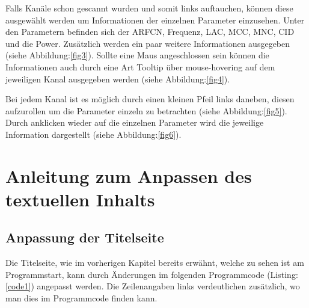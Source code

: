 \noindent Falls Kanäle schon gescannt wurden und somit links auftauchen, können diese ausgewählt werden um Informationen der einzelnen Parameter einzusehen.
Unter den Parametern befinden sich der ARFCN, Frequenz, LAC, MCC, MNC, CID und die Power.
Zusätzlich werden ein paar weitere Informationen ausgegeben (siehe Abbildung:\ref{fig3}).
Sollte eine Maus angeschlossen sein können die Informationen auch durch eine Art Tooltip über mouse-hovering auf dem jeweiligen Kanal ausgegeben werden (siehe Abbildung:\ref{fig4}).




\newpage Bei jedem Kanal ist es möglich durch einen kleinen Pfeil links daneben, diesen aufzurollen um die Parameter einzeln zu betrachten (siehe Abbildung:\ref{fig5}). Durch anklicken wieder auf die einzelnen Parameter wird die jeweilige Information dargestellt (siehe Abbildung:\ref{fig6}).




\newpage
\section{Anleitung zum Anpassen des textuellen Inhalts}

%
%

\subsection*{Anpassung der Titelseite}

%
%
Die Titelseite, wie im vorherigen Kapitel bereits erwähnt, welche zu sehen ist am Programmstart, kann durch Änderungen im folgenden Programmcode (Listing: \ref{code1}) angepasst werden.
Die Zeilenangaben links verdeutlichen zusätzlich, wo man dies im Programmcode finden kann.

